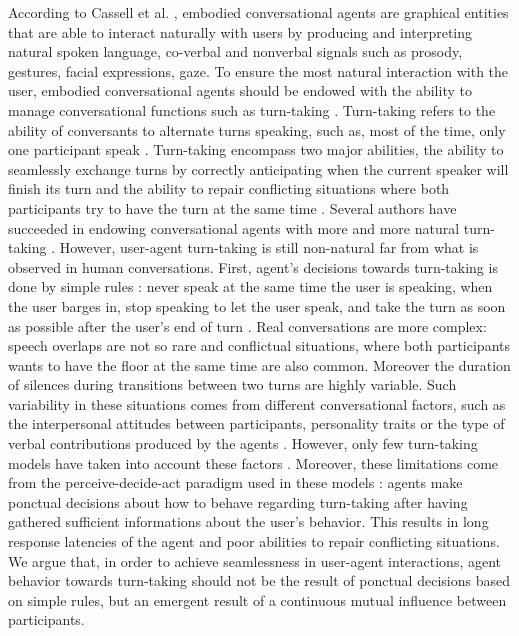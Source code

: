 







According to Cassell et al. \cite{cassell_embodiment_1999}, embodied conversational agents are graphical entities that are able to interact naturally with users by producing and interpreting natural spoken language, co-verbal and nonverbal signals such as prosody, gestures, facial expressions, gaze. 
To ensure the most natural interaction with the user, embodied conversational agents should be endowed with the ability to manage conversational functions such as turn-taking \citep{cassell_embodiment_1999}. Turn-taking refers to the ability of conversants to alternate turns speaking, such as, most of the time, only one participant speak \citep{sacks_simplest_1974}. Turn-taking encompass two major abilities, the ability to seamlessly exchange turns by correctly anticipating when the current speaker will finish its turn and the ability to repair conflicting situations where both participants try to have the turn at the same time \citep{thorisson_natural_2002}. 
Several authors have succeeded in endowing conversational agents with more and more natural turn-taking \citep{thorisson_natural_2002,raux_optimizing_2012,jonsdottir_distributed_2013}. However, user-agent turn-taking is still non-natural far from what is observed in human conversations. First, agent's decisions towards turn-taking is done by simple rules : never speak at the same time the user is speaking, when the user barges in, stop speaking to let the user speak, and take the turn as soon as possible after the user's end of turn \citep{ter_maat_how_2010}. Real conversations are more complex: speech overlaps are not so rare and conflictual situations, where both participants wants to have the floor at the same time are also common. Moreover the duration of silences during transitions between two turns are highly variable. Such variability in these situations comes from different conversational factors, such as the interpersonal attitudes between participants, personality traits \citep{ter_maat_how_2010} or the type of verbal contributions produced by the agents \citep{cafaro_effects_2016}. However, only few turn-taking models have taken into account these factors \citep{lessmann_towards_2004,ravenet_conversational_2015}.
Moreover, these limitations come from the perceive-decide-act paradigm used in these models : agents make ponctual decisions about how to behave regarding turn-taking after having gathered sufficient informations about the user's behavior. This results in long response latencies of the agent and poor abilities to repair conflicting situations. We argue that, in order to achieve seamlessness in user-agent interactions, agent behavior towards turn-taking should not be the result of ponctual decisions based on simple rules, but an emergent result of a continuous mutual influence between participants. 

